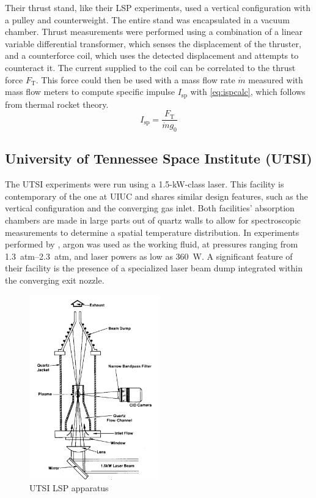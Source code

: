             Their thrust stand, like their LSP experiments, used a vertical configuration with a pulley and counterweight. The entire stand was encapsulated in a vacuum chamber. Thrust measurements were performed using  a combination of a linear variable differential transformer, which senses the displacement of the thruster, and a counterforce coil, which uses the detected displacement and attempts to counteract it. The current supplied to the coil can be correlated to the thrust force $F_\text{T}$. This force could then be used with a mass flow rate $\dot{m}$ measured with mass flow meters to compute specific impulse $I_\text{sp}$ with \autoref{eq:ispcalc}, which follows from thermal rocket theory.
            \begin{equation}
                I_\text{sp} = \frac{F_\text{T}}{\dot{m}g_0}
                \label{eq:ispcalc}
            \end{equation}

        \subsection{University of Tennessee Space Institute (UTSI)}
            The UTSI experiments were run using a 1.5-kW-class  laser. This facility is contemporary of the one at UIUC and shares similar design features, such as the vertical configuration and the converging gas inlet. Both facilities' absorption chambers are made in large parts out of quartz walls to allow for spectroscopic measurements to determine a spatial temperature distribution. In experiments performed by \textcite{keeferPowerAbsorptionLasersustained1986}, argon was used as the working fluid, at pressures ranging from \qtyrange{1.3}{2.3}{atm}, and laser powers as low as 360~W. A significant feature of their facility is the presence of a specialized laser beam dump integrated within the converging exit nozzle.

            \begin{figure}[h]
                \centering
                \includegraphics[width=0.5\textwidth]{assets/2 background/utsi_facility.png}
                \caption[UTSI LSP apparatus]{UTSI LSP apparatus \cite{keeferPowerAbsorptionLasersustained1986}}
                \label{fig:4_utsiExp}
            \end{figure}

